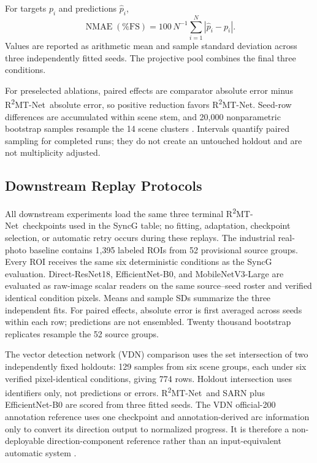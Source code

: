 \documentclass[electronics,article,submit,oneauthor]{Definitions/mdpi}
\newcommand{\modelname}{R\textsuperscript{2}MT-Net}
\begin{document}
For targets $p_i$ and predictions $\hat p_i$,
\begin{equation}
\operatorname{NMAE}(\%\mathrm{FS})=100\,N^{-1}\sum_{i=1}^{N}|\hat p_i-p_i|.
\label{eq:nmae}
\end{equation}
Values are reported as arithmetic mean and sample standard deviation across three independently fitted seeds. The projective pool combines the final three conditions.

For preselected ablations, paired effects are comparator absolute error minus \modelname\ absolute error, so positive reduction favors \modelname. Seed-row differences are accumulated within scene stem, and 20,000 nonparametric bootstrap samples resample the 14 scene clusters \cite{davison1997bootstrap}. Intervals quantify paired sampling for completed runs; they do not create an untouched holdout and are not multiplicity adjusted.

\subsection{Downstream Replay Protocols}
\label{subsec:downstream_protocols}

All downstream experiments load the same three terminal \modelname\ checkpoints used in the SyncG table; no fitting, adaptation, checkpoint selection, or automatic retry occurs during these replays. The industrial real-photo baseline contains 1,395 labeled ROIs from 52 provisional source groups. Every ROI receives the same six deterministic conditions as the SyncG evaluation. Direct-ResNet18, EfficientNet-B0, and MobileNetV3-Large are evaluated as raw-image scalar readers on the same source--seed roster and verified identical condition pixels. Means and sample SDs summarize the three independent fits. For paired effects, absolute error is first averaged across seeds within each row; predictions are not ensembled. Twenty thousand bootstrap replicates resample the 52 source groups.

The vector detection network (VDN) comparison uses the set intersection of two independently fixed holdouts: 129 samples from six scene groups, each under six verified pixel-identical conditions, giving 774 rows. Holdout intersection uses identifiers only, not predictions or errors. \modelname\ and SARN plus EfficientNet-B0 are scored from three fitted seeds. The VDN official-200 annotation reference uses one checkpoint and annotation-derived arc information only to convert its direction output to normalized progress. It is therefore a non-deployable direction-component reference rather than an input-equivalent automatic system \cite{dong2021vdn}.
\end{document}

